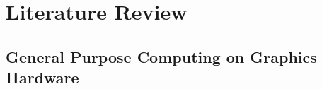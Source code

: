 \chapter{Literature Review}\label{ch:literature_review}






\section{General Purpose Computing on Graphics Hardware} %
\label{sec:gpgpu}


